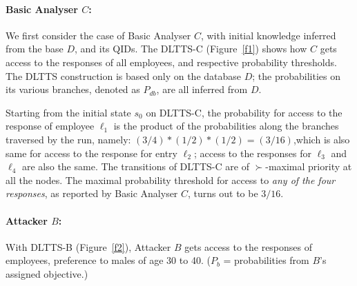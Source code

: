 \documentclass[pdflatex]{article}
\def \lft {\noindent}
\begin{document}
\vspace*{-1.4em}\lft
\paragraph{Basic Analyser $C$:} We first  consider  the case of Basic Analyser
$C$, with initial knowledge inferred from the base $D$, and its QIDs.
The DLTTS-C (Figure~\ref{f1}) shows how  $C$ gets access  to the responses
of all  employees, and respective probability thresholds. The DLTTS construction is
based only on the database $D$; the probabilities on its various branches, denoted as
$P_{db}$,  are all inferred  from $D$.

Starting from the initial state $s_0$ on  DLTTS-C, the probability for access to the
response of employee $\ell_1$ is the product of the probabilities along the branches
traversed by the run, namely: $(3/4)*(1/2)*(1/2) = (3/16)$,which is also  same for
access to the response for entry $\ell_2$;  access to the responses for $\ell_3$ and
$\ell_4$ are  also the same. 
The transitions of DLTTS-C are of $\succ$-maximal priority at all the nodes.
The maximal probability threshold  for access to {\em any of the four responses}, as
reported by Basic Analyser $C$, turns out to be $3/16$. 

\vspace*{-1em}
\paragraph{Attacker $B$:} 
With DLTTS-B  (Figure~\ref{f2}), Attacker $B$ gets access to the responses
of employees, preference to  males of age 30 to 40.  ($P_b$ = probabilities
from $B$'s assigned objective.)
\end{document}
